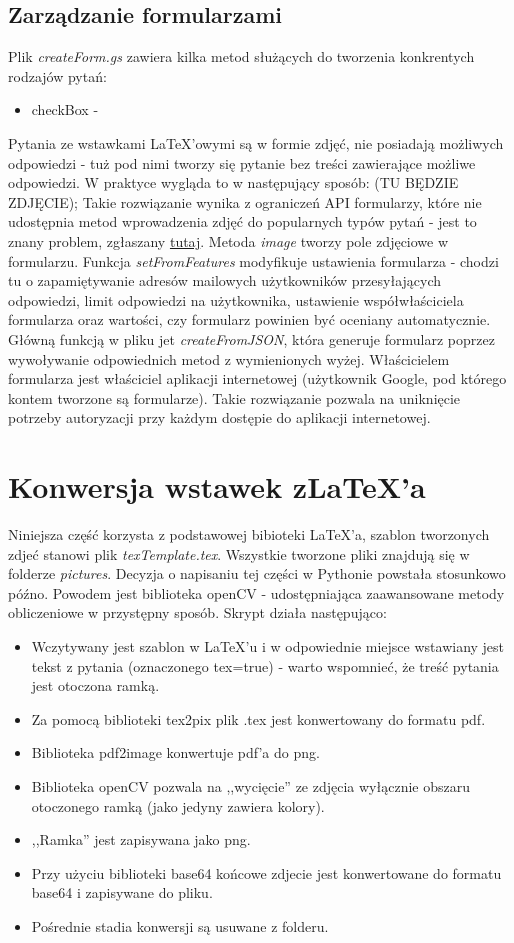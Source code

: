 \subsection{Zarządzanie formularzami}
Plik \textit{createForm.gs} zawiera kilka metod służących do tworzenia konkrentych rodzajów pytań:
\begin{itemize} %
\item checkBox - 
\end{itemize}
Pytania ze wstawkami \LaTeX{}'owymi są w formie zdjęć, nie posiadają możliwych odpowiedzi - tuż pod nimi tworzy się pytanie bez treści zawierające możliwe odpowiedzi. W praktyce wygląda to w następujący sposób: (TU BĘDZIE ZDJĘCIE);
Takie rozwiązanie wynika z ograniczeń  API formularzy, które nie udostępnia metod wprowadzenia zdjęć do popularnych typów pytań - jest to znany problem, zgłaszany \href{https://issuetracker.google.com/issues/36765518?pli=1}{tutaj}. Metoda \textit{image} tworzy pole zdjęciowe w formularzu. 
Funkcja \textit{setFromFeatures} modyfikuje ustawienia formularza - chodzi tu o zapamiętywanie adresów mailowych użytkowników przesyłających odpowiedzi, limit odpowiedzi na użytkownika, ustawienie współwłaściciela formularza oraz wartości, czy formularz powinien być oceniany automatycznie.
\ind Główną funkcją w pliku jet \textit{createFromJSON}, która generuje formularz poprzez wywoływanie odpowiednich metod z wymienionych wyżej. Właścicielem formularza jest właściciel aplikacji internetowej (użytkownik Google, pod którego  kontem tworzone są formularze). Takie rozwiązanie pozwala na uniknięcie potrzeby autoryzacji przy każdym dostępie do aplikacji internetowej.

\section{Konwersja wstawek z\LaTeX{}'a}
Niniejsza część korzysta z podstawowej bibioteki \LaTeX{}'a, szablon tworzonych zdjeć stanowi plik \textit{texTemplate.tex}. Wszystkie tworzone pliki znajdują się w folderze \textit{pictures}.
\ind Decyzja o napisaniu tej części w Pythonie powstała stosunkowo późno. Powodem jest biblioteka openCV - udostępniająca zaawansowane metody obliczeniowe w przystępny sposób. Skrypt działa następująco:
\begin{itemize}
\item Wczytywany jest szablon w \LaTeX{}'u i w odpowiednie miejsce wstawiany jest tekst z pytania (oznaczonego tex=true) - warto wspomnieć, że treść pytania jest otoczona ramką.
\item Za pomocą biblioteki tex2pix plik .tex jest konwertowany do formatu pdf.
\item Biblioteka pdf2image konwertuje pdf'a do png.
\item Biblioteka openCV pozwala na ,,wycięcie'' ze zdjęcia wyłącznie obszaru otoczonego ramką (jako jedyny zawiera kolory).
\item ,,Ramka'' jest zapisywana jako png.
\item Przy użyciu biblioteki base64 końcowe zdjecie jest konwertowane do formatu base64 i zapisywane do pliku.
\item Pośrednie stadia konwersji są usuwane z folderu.
\end{itemize}
